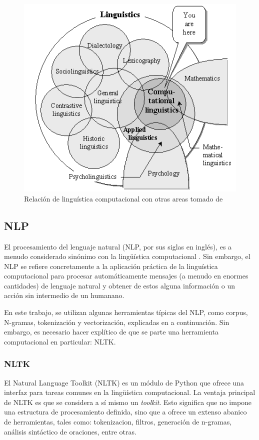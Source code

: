\documentclass[12pt,letterpaper,twoside]{article}
\begin{document}
\begin{figure}[htbp]
\centering
\includegraphics[width=.9\linewidth]{./assets/mapa_linguistica.png}
\caption{\label{fig:org214ae5d}Relación de linguística computacional con otras areas tomado de \cite{gelbukh2004}}
\end{figure}


\subsection{NLP}
\label{sec:orgb19a1b9}
El procesamiento del lenguaje natural (NLP, por sus siglas en
inglés), es a menudo considerado sinónimo con la lingüística
computacional \cite{gelbukh2004}.  Sin embargo, el NLP se refiere
concretamente a la aplicación práctica de la linguística
computacional para procesar automáticamente mensajes (a menudo en
enormes cantidades) de lenguaje natural y obtener de estos alguna
información o un acción sin intermedio de un humanano.

En este trabajo, se utilizan algunas herramientas típicas del
NLP, como corpus, N-gramas, tokenización y vectorización, explicadas
en a continuación. Sin embargo, es necesario hacer explítico de
que se parte una herramienta computacional en particular: NLTK.

\subsubsection{NLTK}
\label{sec:org1b66edb}
El Natural Language Toolkit (NLTK) es un módulo de Python que ofrece
una interfaz para tareas comunes en la lingüística computacional. La
ventaja principal de NLTK es que se considera a sí mismo un
\emph{toolkit}. Esto significa que no impone una estructura de
procesamiento definida, sino que a ofrece un extenso abanico de
herramientas, tales como: tokenizacion, filtros, generación de
n-gramas, análisis sintáctico de oraciones, entre otras.
\end{document}
